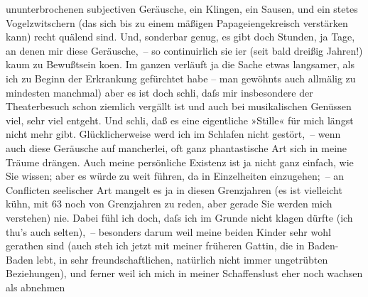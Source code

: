 \begin{ledgroupsized}[t]{13cm}
               ununterbrochenen subjectiven Geräusche, ein Klingen, ein Sausen, und ein \strikeout{\textcolor{gray}{nicht}} stetes Vogelzwitschern (das sich bis zu einem mäßigen Papageiengekreisch
               verstärken kann) recht quälend sind. Und, sonderbar genug, es gibt doch Stunden, ja
               Tage, an denen mir diese Geräusche, – so continuirlich sie i{\geminationm}er (seit bald dreißig Jahren!) kaum zu Bewußtsein ko{\geminationm}en. Im ganzen verläuft ja die Sache etwas langsamer,
               als ich zu Beginn der Erkrankung gefürchtet habe – man gewöhnts auch allmälig \label{T_L02444_1v}\label{T_L02444_1h}zu mindesten manchmal) aber es ist doch schli{\geminationm}, daſs mir insbesondere der Theaterbesuch schon
               ziemlich vergällt ist und auch bei musikalischen Genüssen viel, sehr viel entgeht.
               Und schli{\geminationm}, {\pb}daß es
               eine eigentliche »Stille« für mich längst nicht mehr gibt. Glücklicherweise werd ich
               im Schlafen nicht gestört, – wenn auch diese Geräusche auf mancherlei, oft ganz
               phantastische Art sich in meine Träume drängen.\pend
           \pstart
           Auch meine persönliche Existenz ist ja nicht ganz einfach, wie Sie wissen; aber es
               würde zu weit führen, da in Einzelheiten einzugehen; – an Conflicten seelischer Art
               mangelt es ja in diesen Grenzjahren (es ist vielleicht kühn, mit 63 noch von
               Grenzjahren zu reden, aber gerade Sie werden mich verstehen) nie.\pend
           \pstart
           Dabei fühl ich doch, daſs ich im Grunde nicht klagen dürfte (ich thu’s auch
               selten), – besonders darum weil meine beiden Kinder sehr wohl gerathen sind (auch steh ich jetzt mit
               meiner früheren Gattin, die in
                  Baden-Baden lebt, in sehr freundschaftlichen,
               natürlich nicht immer unge{\pb}trübten Beziehungen),
               und ferner weil ich mich in meiner Schaffenslust eher noch wachsen als abnehmen

\end{ledgroupsized}
